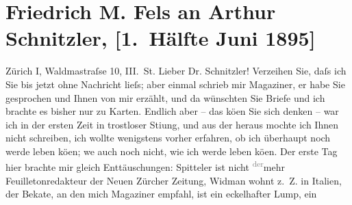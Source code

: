                \section[Friedrich M. Fels an Arthur Schnitzler, {[}1. Hälfte Juni 1895{]}]{ Friedrich M. Fels an Arthur Schnitzler, {[}1. Hälfte Juni
                    1895{]}}\nopagebreak{}\rehead{ }\begin{ledgroupsized}[t]{13cm}\normalsize\beginnumbering \toendnotes[C]{\smallbreak\pagebreak[2]} 
\toendnotes[C]{\smallbreak}\pstart
           \raggedleft{}{\pb}Zürich I, Waldma{\geminationn}straſse 10, III. St.\pend
           \pstart{}Lieber Dr. Schnitzler!\pend\pstart
           Verzeihen Sie, daſs ich Sie bis jetzt ohne Nachricht lieſs; aber einmal schrieb
                    mir Magaziner, er habe Sie gesprochen und
                    Ihnen von mir erzählt, und da{\geminationn} wünschten Sie Briefe
                    und \introOben{}ich\introOben{} brachte es bisher nur zu Karten. Endlich aber –
                    das kö{\geminationn}en Sie sich denken – war ich in der ersten
                    Zeit in trostloser Sti{\geminationm}ung, und aus der heraus
                    mochte ich Ihnen nicht schreiben, ich wollte wenigstens vorher erfahren, ob ich
                    überhaupt noch werde leben kö{\geminationn}en; we{\geminationn} auch noch nicht, wie ich werde leben kö{\geminationn}en. Der erste Tag hier brachte mir gleich
                    Enttäuschungen: Spitteler ist nicht \substVorne{}\textsuperscript{\textcolor{gray}{der}}\substDazwischen{}mehr\substHinten{} Feuilletonredakteur der Neuen Zürcher
                        Zeitung, Widman wohnt z. Z. in
                    Italien, der Beka{\geminationn}te, an den mich Magaziner empfahl, ist ein eckelhafter Lump, ein

\end{ledgroupsized}
